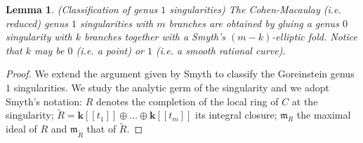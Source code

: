 \documentclass[11pt]{amsart}
\renewcommand{\k}{\mathbf k}
\theoremstyle{plain}
\newtheorem{lem}[thm]{Lemma}
\theoremstyle{definition}
\begin{document}
\begin{lem}(Classification of genus $1$ singularities)
The Cohen-Macaulay (i.e. reduced) genus $1$ singularities with $m$ branches are obtained by gluing a genus $0$ singularity with $k$ branches together with a Smyth's $(m-k)$-elliptic fold.
Notice that $k$ may be $0$ (i.e. a point) or $1$ (i.e. a smooth rational curve).
\end{lem}
\begin{proof}
We extend the argument given by Smyth \cite[Appendix~A]{SMY1} to classify the Goreinstein genus $1$ singularities. We study the analytic germ of the singularity and we adopt Smyth's notation: $R$ denotes the completion of the local ring of $C$ at the singularity; 
$\widetilde{R}=\k[[t_1]]\oplus\ldots\oplus \k[[t_m]]$ its integral closure; $\mathfrak{m}_R$ the maximal ideal of $R$  and $\mathfrak{m}_{\widetilde{R}}$ that of $\widetilde{R}.$


\end{proof}
\end{document}
